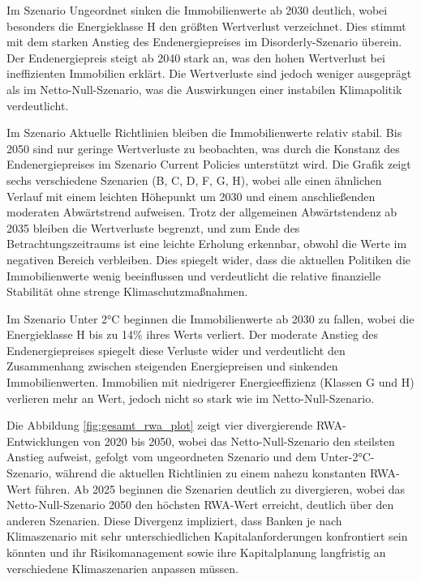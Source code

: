 Im Szenario Ungeordnet sinken die Immobilienwerte ab 2030 deutlich, wobei besonders die Energieklasse H den größten Wertverlust verzeichnet. Dies stimmt mit dem starken Anstieg des Endenergiepreises im Disorderly-Szenario überein. Der Endenergiepreis steigt ab 2040 stark an, was den hohen Wertverlust bei ineffizienten Immobilien erklärt. Die Wertverluste sind jedoch weniger ausgeprägt als im Netto-Null-Szenario, was die Auswirkungen einer instabilen Klimapolitik verdeutlicht.

Im Szenario Aktuelle Richtlinien bleiben die Immobilienwerte relativ stabil. Bis 2050 sind nur geringe Wertverluste zu beobachten, was durch die Konstanz des Endenergiepreises im Szenario Current Policies unterstützt wird. Die Grafik zeigt sechs verschiedene Szenarien (B, C, D, F, G, H), wobei alle einen ähnlichen Verlauf mit einem leichten Höhepunkt um 2030 und einem anschließenden moderaten Abwärtstrend aufweisen. Trotz der allgemeinen Abwärtstendenz ab 2035 bleiben die Wertverluste begrenzt, und zum Ende des Betrachtungszeitraums ist eine leichte Erholung erkennbar, obwohl die Werte im negativen Bereich verbleiben. Dies spiegelt wider, dass die aktuellen Politiken die Immobilienwerte wenig beeinflussen und verdeutlicht die relative finanzielle Stabilität ohne strenge Klimaschutzmaßnahmen.

Im Szenario Unter 2°C beginnen die Immobilienwerte ab 2030 zu fallen, wobei die Energieklasse H bis zu 14\% ihres Werts verliert. Der moderate Anstieg des Endenergiepreises spiegelt diese Verluste wider und verdeutlicht den Zusammenhang zwischen steigenden Energiepreisen und sinkenden Immobilienwerten. Immobilien mit niedrigerer Energieeffizienz (Klassen G und H) verlieren mehr an Wert, jedoch nicht so stark wie im Netto-Null-Szenario.


Die Abbildung \ref{fig:gesamt_rwa_plot} zeigt vier divergierende \acs{RWA}-Entwicklungen von 2020 bis 2050, wobei das Netto-Null-Szenario den steilsten Anstieg aufweist, gefolgt vom ungeordneten Szenario und dem Unter-2°C-Szenario, während die aktuellen Richtlinien zu einem nahezu konstanten \acs{RWA}-Wert führen. Ab 2025 beginnen die Szenarien deutlich zu divergieren, wobei das Netto-Null-Szenario 2050 den höchsten \acs{RWA}-Wert erreicht, deutlich über den anderen Szenarien. Diese Divergenz impliziert, dass Banken je nach Klimaszenario mit sehr unterschiedlichen Kapitalanforderungen konfrontiert sein könnten und ihr Risikomanagement sowie ihre Kapitalplanung langfristig an verschiedene Klimaszenarien anpassen müssen.